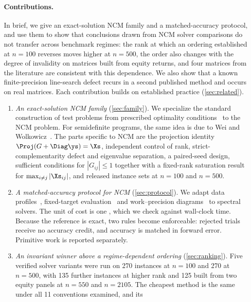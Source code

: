 \paragraph{Contributions.}
In brief, we give an exact-solution NCM family and a matched-accuracy
protocol, and use them to show that conclusions drawn from NCM solver
comparisons do not transfer across benchmark regimes: the rank at which an
ordering established at $n=100$ reverses moves higher at $n=500$, the order
also changes with the degree of invalidity on matrices built from equity
returns, and four matrices from the literature are consistent with this
dependence. We also show that a known
finite-precision line-search defect recurs in a second published method and
occurs on real matrices.
Each contribution builds on established practice (\cref{sec:related}).
\begin{enumerate}
  \item \emph{An exact-solution NCM family} (\cref{sec:family}). We specialize
    the standard construction of test problems from prescribed optimality
    conditions~\cite{lenard1984randomly,calamai1993new} to the NCM problem.
    For semidefinite programs, the same idea is due to Wei and
    Wolkowicz~\cite{wei2010generating}. The parts specific to NCM are the
    projection identity $\Proj(G+\Diag\ys)=\Xs$, independent control of rank,
    strict-complementarity defect and eigenvalue separation, a paired-seed
    design, sufficient conditions for $|G_{ij}|\le1$ together with a
    fixed-rank saturation result for $\max_{i\ne j}|\Xs_{ij}|$, and released
    instance sets at $n=100$ and $n=500$.
  \item \emph{A matched-accuracy protocol for NCM} (\cref{sec:protocol}). We
    adapt data profiles~\cite{more2009benchmarking}, fixed-target
    evaluation~\cite{hansen2021coco} and work--precision
    diagrams~\cite{hairer1996solving} to spectral solvers. The unit of cost is
    one \EVD, which we check against wall-clock time. Because the reference is
    exact, two rules become enforceable: rejected trials receive no accuracy
    credit, and accuracy is matched in forward error. Primitive work is
    reported separately.
  \item \emph{An invariant winner above a regime-dependent ordering}
    (\cref{sec:ranking}). Five verified solver variants were run on 270
    instances at $n=100$ and 270 at $n=500$, with 135 further instances at
    higher rank and 125 built from two equity panels at $n=550$ and $n=2105$.
    The cheapest method is the same under all 11 conventions examined, and its

\end{enumerate}
